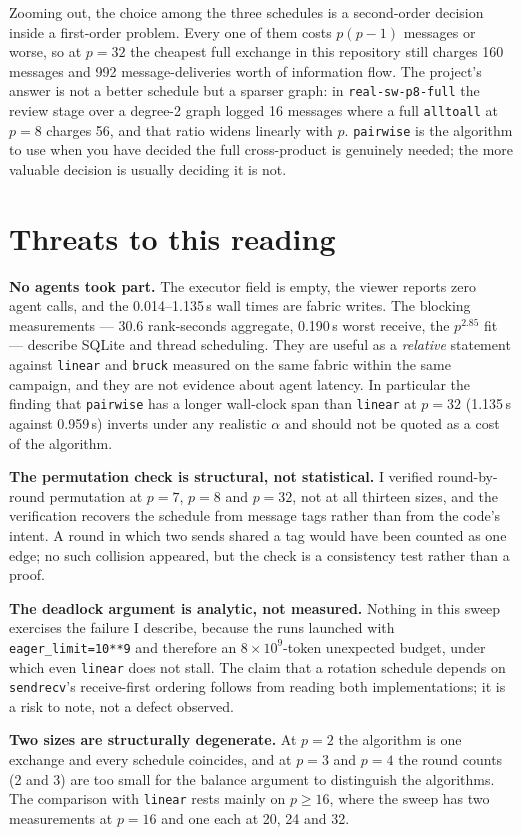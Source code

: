 \documentclass[11pt]{article}
\begin{document}
Zooming out, the choice among the three schedules is a second-order decision inside a
first-order problem. Every one of them costs $p(p-1)$ messages or worse, so at $p=32$ the
cheapest full exchange in this repository still charges 160 messages and 992 message-deliveries
worth of information flow. The project's answer is not a better schedule but a sparser graph:
in \texttt{real-sw-p8-full} the review stage over a degree-2 graph logged 16 messages where a
full \texttt{alltoall} at $p=8$ charges 56, and that ratio widens linearly with $p$.
\texttt{pairwise} is the algorithm to use when you have decided the full cross-product is
genuinely needed; the more valuable decision is usually deciding it is not.

\section{Threats to this reading}

\textbf{No agents took part.} The executor field is empty, the viewer reports zero agent calls,
and the 0.014--1.135\,s wall times are fabric writes. The blocking measurements --- 30.6
rank-seconds aggregate, 0.190\,s worst receive, the $p^{2.85}$ fit --- describe SQLite and
thread scheduling. They are useful as a \emph{relative} statement against \texttt{linear} and
\texttt{bruck} measured on the same fabric within the same campaign, and they are not evidence
about agent latency. In particular the finding that \texttt{pairwise} has a longer wall-clock
span than \texttt{linear} at $p=32$ (1.135\,s against 0.959\,s) inverts under any realistic
$\alpha$ and should not be quoted as a cost of the algorithm.

\textbf{The permutation check is structural, not statistical.} I verified round-by-round
permutation at $p=7$, $p=8$ and $p=32$, not at all thirteen sizes, and the verification
recovers the schedule from message tags rather than from the code's intent. A round in which
two sends shared a tag would have been counted as one edge; no such collision appeared, but the
check is a consistency test rather than a proof.

\textbf{The deadlock argument is analytic, not measured.} Nothing in this sweep exercises the
failure I describe, because the runs launched with \texttt{eager\_limit=10**9} and therefore an
$8\times10^9$-token unexpected budget, under which even \texttt{linear} does not stall. The
claim that a rotation schedule depends on \texttt{sendrecv}'s receive-first ordering follows
from reading both implementations; it is a risk to note, not a defect observed.

\textbf{Two sizes are structurally degenerate.} At $p=2$ the algorithm is one exchange and
every schedule coincides, and at $p=3$ and $p=4$ the round counts (2 and 3) are too small for
the balance argument to distinguish the algorithms. The comparison with \texttt{linear} rests
mainly on $p \geq 16$, where the sweep has two measurements at $p=16$ and one each at 20, 24
and 32.
\end{document}
